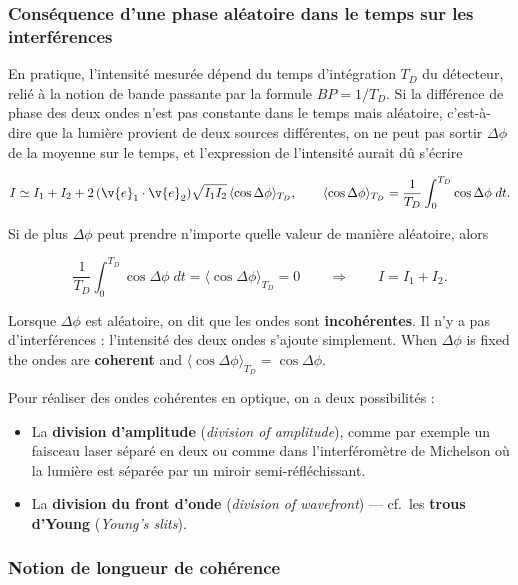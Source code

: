 \subsubsection{Conséquence d'une phase aléatoire dans le temps sur les interférences}

En pratique, l'intensité mesurée dépend du temps d'intégration $T_D$ du
détecteur, relié à la notion de bande passante par la formule $BP = 1/T_D$. Si la
différence de phase des deux ondes n'est pas constante dans le temps mais
aléatoire, c'est-à-dire que la lumière provient de deux sources différentes, on
ne peut pas sortir $\Delta\phi$ de la moyenne sur le temps, et l'expression de
l'intensité aurait dû s'écrire

\[ I \simeq I_1 + I_2 + 2\,(\v{e}_1\cdot\v{e}_2)\sqrt{I_1 I_2}\,
     \langle \cos\Delta\phi \rangle_{T_D},
   \qquad
   \langle \cos\Delta\phi \rangle_{T_D}
     = \frac{1}{T_D}\int_0^{T_D} \cos\Delta\phi \; dt . \]

Si de plus $\Delta\phi$ peut prendre n'importe quelle valeur de manière
aléatoire, alors

\[ \frac{1}{T_D}\int_0^{T_D} \cos\Delta\phi \; dt
   = \langle \cos\Delta\phi \rangle_{T_D} = 0
   \qquad\Longrightarrow\qquad I = I_1 + I_2 . \]

\begin{definition}
  Lorsque $\Delta\phi$ est aléatoire, on dit que les ondes sont
  \textbf{incohérentes}. Il n'y a pas d'interférences : l'intensité des deux
  ondes s'ajoute simplement. When $\Delta\phi$ is fixed the ondes are
  \textbf{coherent} and $\langle\cos\Delta\phi\rangle_{T_D} = \cos\Delta\phi$.
\end{definition}

Pour réaliser des ondes cohérentes en optique, on a deux possibilités :

\begin{itemize}
  \item La \textbf{division d'amplitude} (\textit{division of amplitude}), comme
    par exemple un faisceau laser séparé en deux ou comme dans l'interféromètre
    de Michelson où la lumière est séparée par un miroir semi-réfléchissant.
  \item La \textbf{division du front d'onde} (\textit{division of wavefront})
    --- cf.\ les \textbf{trous d'Young} (\textit{Young's slits}).
\end{itemize}

\subsubsection{Notion de longueur de cohérence}

